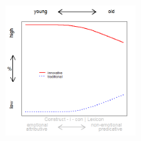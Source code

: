 \documentclass[12pt, table]{beamer}
\begin{document}
\begin{frame}
\begin{minipage}[t]{\linewidth}
\begin{minipage}{.45\linewidth}
\begin{tabular}{cccccccccc }
\end{tabular}
\end{minipage}
\hfill
\begin{minipage}{.45\linewidth}
\begin{figure}
\includegraphics[width=5cm]{images/LangChang18.png}
\end{figure}
\end{minipage}
\end{minipage}
\end{frame}
\end{document}
